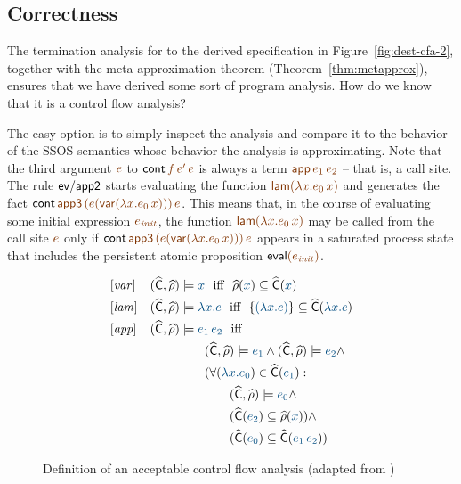 \subsection{Correctness}

The termination analysis for to the derived specification in
Figure~\ref{fig:dest-cfa-2}, together with the meta-approximation
theorem (Theorem~\ref{thm:metapprox}), ensures that we have derived
some sort of program analysis. How do we know that it is a control 
flow analysis? 

The easy option is to simply inspect the analysis and compare it to
the behavior of the SSOS semantics whose behavior the analysis is
approximating.  Note that the third argument $\lf{e}$ to ${\sf
  cont}\,\lf{f}\,\lf{e'}\,\lf{e}$ is always a term $\lf{{\sf
    app}\,e_1\,e_2}$ -- that is, a call site. The rule ${\sf ev/app2}$
starts evaluating the function $\lf{{\sf lam}(\lambda x.e_0\,x)}$ and
generates the fact ${\sf cont}\,\lf{\sf app3}\,\lf{(e({\sf
    var}(\lambda x.e_0\,x)))}\,\lf{e}$. This means that, in the course
of evaluating some initial expression $\lf{e_{\it init}}$, the
function $\lf{{\sf lam}(\lambda x.e_0\,x)}$ may be called from the
call site $\lf{e}$ only if ${\sf cont}\,\lf{\sf app3}\,\lf{(e({\sf
    var}(\lambda x.e_0\,x)))}\,\lf{e}$ appears in a saturated process
state that includes the persistent atomic proposition ${\sf
  eval}\lf{(e_{\it init})}$.

\begin{figure}
\begin{align*}
& [{\it var}] & (\widehat{\sf C}, \widehat{\rho}) & \models
  \obj{x} 
  \mbox{~~iff~~} \widehat{\rho}(\obj{x})
    \subseteq \widehat{\sf C}(\obj{x})
\\
& [{\it lam}] & (\widehat{\sf C}, \widehat{\rho}) & \models
  \obj{\lambda x.e}
  \mbox{~~iff~~} \{ \obj{(\lambda x.e)} \} 
    \subseteq \widehat{\sf C}(\obj{\lambda x.e})
\\
& [{\it app}] & (\widehat{\sf C}, \widehat{\rho}) & \models
  \obj{e_1\,e_2} \mbox{~~iff}
\\
& & & \qquad (\widehat{\sf C}, \widehat{\rho}) \models \obj{e_1} \wedge
             (\widehat{\sf C}, \widehat{\rho}) \models \obj{e_2} \wedge ~
\\
& & & \qquad (\forall(\obj{\lambda x.e_0}) \in \widehat{\sf C}(\obj{e_1}) : ~
\\
& & & \qquad\qquad (\widehat{\sf C}, \widehat{\rho}) \models \obj{e_0} \wedge ~
\\
& & & \qquad\qquad (\widehat{\sf C}(\obj{e_2}) \subseteq \widehat{\rho}(\obj{x})) \wedge ~
\\
& & & \qquad\qquad (\widehat{\sf C}(\obj{e_0}) \subseteq \widehat{\sf C}(\obj{e_1\,e_2}))
\end{align*}
\caption{Definition of an acceptable control flow analysis (adapted from
  \cite[p.~146]{nielson05principles})}
\label{fig:acceptablecontrolflowanalysis}
\end{figure}


